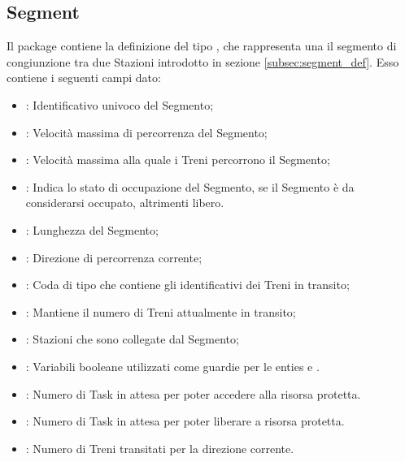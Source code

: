 \subsection{Segment}
	
	Il package  contiene la definizione del tipo ,  che rappresenta una il segmento di congiunzione tra due Stazioni introdotto in sezione \ref{subsec:segment_def}. Esso contiene i seguenti campi dato:
	\begin{itemize}
		
		\item {}: Identificativo univoco del Segmento;
		\item {}: Velocità massima di percorrenza del Segmento;
		\item {}: Velocità massima alla quale i Treni percorrono il Segmento;
		\item {}: Indica lo stato di occupazione del Segmento, se  il Segmento è da considerarsi occupato, altrimenti libero.
		\item {}: Lunghezza del Segmento;
		
		\item {}: Direzione di percorrenza corrente;
		
		\item {}: Coda di tipo  che contiene gli identificativi dei Treni in transito;
		\item {}: Mantiene il numero di Treni attualmente in transito;
		
		
		\item {}: Stazioni che sono collegate dal Segmento; 
		
		\item {}: Variabili booleane utilizzati come guardie per le enties  e .
		
		\item {}: Numero di Task in attesa per poter accedere alla risorsa protetta.
		
		\item {}:  Numero di Task in attesa per poter liberare a risorsa protetta. 
		
		\item {}: Numero di Treni transitati per la direzione corrente.
		
	\end{itemize}
	
